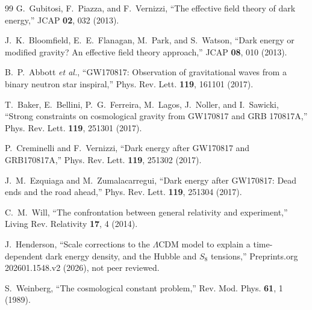 \documentclass[aps,prd,reprint,nofootinbib,superscriptaddress,longbibliography]{revtex4-2}
\begin{document}
\begin{thebibliography}{99}
G.~Gubitosi, F.~Piazza, and F.~Vernizzi, ``The effective field theory of dark energy,'' JCAP \textbf{02}, 032 (2013).

J.~K.~Bloomfield, E.~E.~Flanagan, M.~Park, and S.~Watson, ``Dark energy or modified gravity? An effective field theory approach,'' JCAP \textbf{08}, 010 (2013).

B.~P.~Abbott \emph{et al.}, ``GW170817: Observation of gravitational waves from a binary neutron star inspiral,'' Phys. Rev. Lett. \textbf{119}, 161101 (2017).

T.~Baker, E.~Bellini, P.~G.~Ferreira, M.~Lagos, J.~Noller, and I.~Sawicki, ``Strong constraints on cosmological gravity from GW170817 and GRB 170817A,'' Phys. Rev. Lett. \textbf{119}, 251301 (2017).

P.~Creminelli and F.~Vernizzi, ``Dark energy after GW170817 and GRB170817A,'' Phys. Rev. Lett. \textbf{119}, 251302 (2017).

J.~M.~Ezquiaga and M.~Zumalacarregui, ``Dark energy after GW170817: Dead ends and the road ahead,'' Phys. Rev. Lett. \textbf{119}, 251304 (2017).

C.~M.~Will, ``The confrontation between general relativity and experiment,'' Living Rev. Relativity \textbf{17}, 4 (2014).

J.~Henderson, ``Scale corrections to the $\Lambda$CDM model to explain a time-dependent dark energy density, and the Hubble and $S_8$ tensions,'' Preprints.org 202601.1548.v2 (2026), not peer reviewed.

S.~Weinberg, ``The cosmological constant problem,'' Rev. Mod. Phys. \textbf{61}, 1 (1989).

\end{thebibliography}
\end{document}
